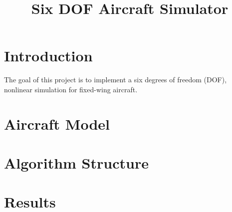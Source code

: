 \documentclass{article}
\title{\textbf{Six DOF Aircraft Simulator}}
\begin{document}
\maketitle

\section{Introduction}
The goal of this project is to implement a six degrees of freedom (DOF), nonlinear simulation for fixed-wing aircraft. 
   
\section{Aircraft Model}


\section{Algorithm Structure}


\section{Results}



\end{document}
